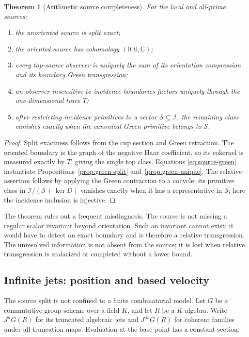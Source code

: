 \documentclass[11pt]{article}
\newtheorem{theorem}{Theorem}[section]
\theoremstyle{definition}
\theoremstyle{remark}
\newcommand{\C}{\mathbb C}
\newcommand{\cI}{\mathcal I}
\newcommand{\cS}{\mathcal S}
\begin{document}
\begin{theorem}[Arithmetic source completeness]
\label{thm:arithmetic-source}
For the local and all-prime sources:
\begin{enumerate}[label=\textup{(\roman*)},leftmargin=2.2em]
\item the unoriented source is split exact;
\item the oriented source has cohomology \((0,0,\C)\);
\item every top-source observer is uniquely the sum of its orientation
      compression and its boundary Green transgression;
\item an observer insensitive to incidence boundaries factors uniquely
      through the one-dimensional trace \(T\);
\item after restricting incidence primitives to a sector
      \(\cS\subseteq\cI\), the remaining class vanishes exactly when the
      canonical Green primitive belongs to \(\cS\).
\end{enumerate}
\end{theorem}

\begin{proof}
Split exactness follows from the cup section and Green retraction.  The
oriented boundary is the graph of the negative Haar coefficient, so its
cokernel is measured exactly by \(T\), giving the single top class.
Equations \eqref{eq:source-green} instantiate
Propositions~\ref{prop:green-split} and~\ref{prop:green-unique}.  The
relative assertion follows by applying the Green contraction to a cocycle:
its primitive class in \(\cI/(\cS+\ker D)\) vanishes exactly when it has a
representative in \(\cS\); here the incidence inclusion is injective.
\end{proof}

The theorem rules out a frequent misdiagnosis.  The source is not missing a
regular scalar invariant beyond orientation.  Such an invariant cannot
exist: it would have to detect an exact boundary and is therefore a relative
transgression.  The unresolved information is not absent from the source;
it is lost when relative transgression is scalarized or completed without a
lower bound.

\subsection{Infinite jets: position and based velocity}

The source split is not confined to a finite combinatorial model.  Let
\(G\) be a commutative group scheme over a field \(K\), and let \(R\) be a
\(K\)-algebra.  Write \(J^nG(R)\) for its truncated algebraic jets and
\(J^\infty G(R)\) for coherent families under all truncation maps.
Evaluation at the base point has a constant section.
\end{document}
